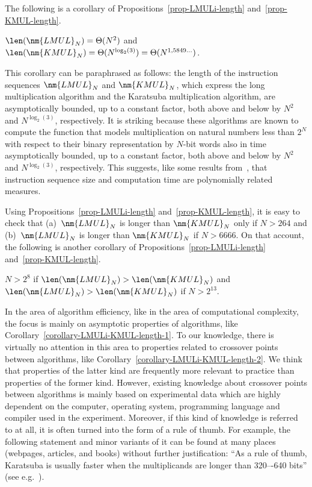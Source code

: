 \documentclass{llncs}
\begin{document}
The following is a corollary of Propositions~\ref{prop-LMULi-length} 
and~\ref{prop-KMUL-length}.
\begin{corollary}
\label{corollary-LMULi-KMUL-length-1}
$\len(\nm{LMUL}_N) = \Theta(N^2)$ and
$\len(\nm{KMUL}_N) = \Theta(N^{\log_2(3)}) = \Theta(N^{1,5849\ldots})$.
\end{corollary}
This corollary can be paraphrased as follows: the length of the 
instruction sequences $\nm{LMUL}_N$ and $\nm{KMUL}_N$, which express the 
long multiplication algorithm and the Karatsuba multiplication 
algorithm, are asymptotically bounded, up to a constant 
factor, both above and below by $N^2$ and $N^{\log_2(3)}$, respectively.
It is striking because these algorithms are known to compute the 
function that models multiplication on natural numbers less than $2^N$ 
with respect to their binary representation by $N$-bit words also in 
time asymptotically bounded, up to a constant factor, both above and 
below by $N^2$ and $N^{\log_2(3)}$, respectively.
This suggests, like some results from~\cite{BM13a}, that instruction 
sequence size and computation time are polynomially related measures.

Using Propositions~\ref{prop-LMULi-length} and~\ref{prop-KMUL-length}, 
it is easy to check that 
(a)~$\nm{LMUL}_N$ is longer than $\nm{KMUL}_N$ only if  $N > 264$ and
(b)~$\nm{LMUL}_N$ is longer than $\nm{KMUL}_N$ if $N > 6666$.
On that account, the following is another corollary of 
Propositions~\ref{prop-LMULi-length} and~\ref{prop-KMUL-length}.
\begin{corollary}
\label{corollary-LMULi-KMUL-length-2}
$N > 2^8$ if $\len(\nm{LMUL}_N) > \len(\nm{KMUL}_N)$ and
$\len(\nm{LMUL}_N) > \len(\nm{KMUL}_N)$ if $N > 2^{13}$.
\end{corollary}
In the area of algorithm efficiency, like in the area of computational 
complexity, the focus is mainly on asymptotic properties of algorithms, 
like Corollary~\ref{corollary-LMULi-KMUL-length-1}.
To our knowledge, there is virtually no attention in this area to 
properties related to crossover points between algorithms, like
Corollary~\ref{corollary-LMULi-KMUL-length-2}.
We think that properties of the latter kind are frequently more relevant 
to practice than properties of the former kind.
However, existing knowledge about crossover points between algorithms 
is mainly based on experimental data which are highly dependent on the
computer, operating system, programming language and compiler used in 
the experiment. 
Moreover, if this kind of knowledge is referred to at all, it is often 
turned into the form of a rule of thumb.
For example, the following statement and minor variants of it can be 
found at many places (webpages, articles, and books) without further 
justification: ``As a rule of thumb, Karatsuba is usually faster when 
the multiplicands are longer than 320–-640 bits'' 
(see e.g.~\cite{Wik13a}).  
\end{document}
